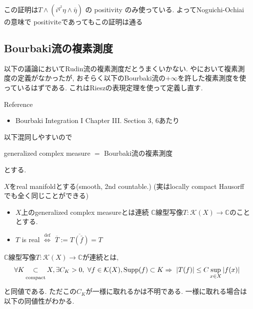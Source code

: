 \begin{rem}
この証明は$T\wedge \left(i^{q^2}\eta \wedge \bar{\eta}\right)$ の positivity のみ使っている. よってNoguichi-Ochiaiの意味で positiviteであってもこの証明は通る
\end{rem}

\subsection{Bourbaki流の複素測度}
以下の議論においてRudin流の複素測度だとうまくいかない. 
\cite{NO}や\cite{Dem}において複素測度の定義がなかったが, おそらく以下のBourbaki流の$+\infty$を許した複素測度を使っているはずである. 
これはRieszの表現定理を使って定義し直す. 

Reference
\begin{itemize}
\item  Bourbaki Integration I Chapter III. Section 3, 6あたり
\end{itemize}

以下混同しやすいので
\begin{center}
generalized complex measure 
$=$
Bourbaki流の複素測度
\end{center}
とする. 

\begin{tcolorbox}[mybox]
\begin{defn}
$X$をreal manifoldとする(smooth, 2nd countable.)
(実はlocally compact Hausorffでも全く同じことができる)
\begin{itemize}
\item $X$上のgeneralized complex measureとは連続 $\mathbb{C}$線型写像$T:\mathcal{K}(X)\to \mathbb{C}$のこととする. 
\item $T$ is real $\overset{\mathrm{def}}{\Longleftrightarrow}$ $\overline{T}:=\overline{T(\bar f)}=T$
\end{itemize}
\end{defn}
\end{tcolorbox}


$\mathbb{C}$線型写像$T:\mathcal{K}(X)\to \mathbb{C}$が連続とは, 
$$
\forall K \underalign{\text{compact}}{\subset} X, 
\exists C_K>0,\ \forall f\in \mathcal{K}(X), \mathrm{Supp}(f) \subset K\Rightarrow \ |T(f)|\leq C\sup_{x\in X}|f(x)|
$$
と同値である. ただこの$C_K$が一様に取れるかは不明である. 一様に取れる場合は以下の同値性がわかる. 

